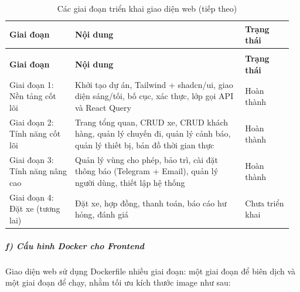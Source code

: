 \documentclass[a4paper]{extarticle}
\newcommand{\thesissettableid}[2]{%
  \renewcommand{\thetable}{#1}%
  \renewcommand{\theHtable}{#2}%
}
\begin{document}
{\thesissettableid{4.9}{tab-ch4-cac-giai-oan-trien-khai-frontend}
\def\LTcaptype{table}
\begin{longtable}{|L{0.224\linewidth}|L{0.580\linewidth}|L{0.160\linewidth}|}
\caption{Các giai đoạn triển khai giao diện web}\label{tab:ch4-cac-giai-oan-trien-khai-frontend}\\
\hline \textbf{Giai đoạn} & \textbf{Nội dung} & \textbf{Trạng thái} \\
\hline
\endfirsthead
\caption[]{Các giai đoạn triển khai giao diện web (tiếp theo)}\\
\hline \textbf{Giai đoạn} & \textbf{Nội dung} & \textbf{Trạng thái} \\
\hline
\endhead
\hline
\endfoot
\endlastfoot
Giai đoạn 1: Nền tảng cốt lõi & Khởi tạo dự án, Tailwind + shadcn/ui,
giao diện sáng/tối, bố cục, xác thực, lớp gọi API và React Query & Hoàn thành \\\hline
Giai đoạn 2: Tính năng cốt lõi & Trang tổng quan, CRUD xe, CRUD khách hàng, quản lý chuyến đi,
quản lý cảnh báo, quản lý thiết bị, bản đồ thời gian thực & Hoàn
thành \\\hline
Giai đoạn 3: Tính năng nâng cao & Quản lý vùng cho phép, bảo trì,
cài đặt thông báo (Telegram + Email), quản lý người dùng, thiết lập hệ thống &
Hoàn thành \\\hline
Giai đoạn 4: Đặt xe (tương lai) & Đặt xe, hợp đồng, thanh toán, báo cáo
hư hỏng, đánh giá & Chưa triển khai \\\hline
\end{longtable}
}


\subparagraph{f) Cấu hình Docker cho
Frontend}\label{f-cux1ea5u-huxecnh-docker-cho-frontend}

Giao diện web sử dụng Dockerfile nhiều giai đoạn: một giai đoạn để biên
dịch và một giai đoạn để chạy, nhằm tối ưu kích thước image như sau:
\end{document}

